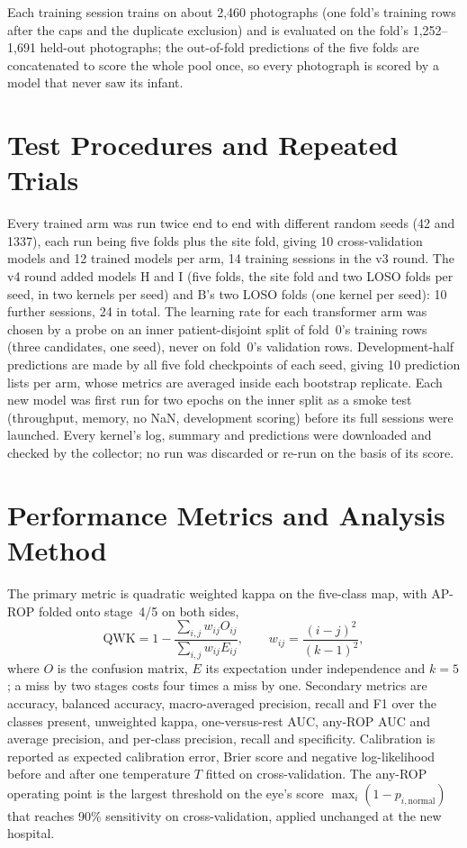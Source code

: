 Each training session trains on about 2{,}460 photographs (one fold's training rows after the caps and the duplicate exclusion) and is evaluated on the fold's 1{,}252--1{,}691 held-out photographs; the out-of-fold predictions of the five folds are concatenated to score the whole pool once, so every photograph is scored by a model that never saw its infant.

\section{Test Procedures and Repeated Trials}
Every trained arm was run twice end to end with different random seeds (42 and 1337), each run being five folds plus the site fold, giving 10 cross-validation models and 12 trained models per arm, 14 training sessions in the v3 round. The v4 round added models H and I (five folds, the site fold and two LOSO folds per seed, in two kernels per seed) and B's two LOSO folds (one kernel per seed): 10 further sessions, 24 in total. The learning rate for each transformer arm was chosen by a probe on an inner patient-disjoint split of fold~0's training rows (three candidates, one seed), never on fold~0's validation rows. Development-half predictions are made by all five fold checkpoints of each seed, giving 10 prediction lists per arm, whose metrics are averaged inside each bootstrap replicate. Each new model was first run for two epochs on the inner split as a smoke test (throughput, memory, no NaN, development scoring) before its full sessions were launched. Every kernel's log, summary and predictions were downloaded and checked by the collector; no run was discarded or re-run on the basis of its score.

\section{Performance Metrics and Analysis Method}
The primary metric is quadratic weighted kappa on the five-class map, with AP-ROP folded onto stage~4/5 on both sides,
\begin{equation}\label{eq:qwk}
\mathrm{QWK}=1-\frac{\sum_{i,j}w_{ij}O_{ij}}{\sum_{i,j}w_{ij}E_{ij}},\qquad w_{ij}=\frac{(i-j)^2}{(k-1)^2},
\end{equation}
where $O$ is the confusion matrix, $E$ its expectation under independence and $k=5$; a miss by two stages costs four times a miss by one. Secondary metrics are accuracy, balanced accuracy, macro-averaged precision, recall and F1 over the classes present, unweighted kappa, one-versus-rest AUC, any-ROP AUC and average precision, and per-class precision, recall and specificity. Calibration is reported as expected calibration error, Brier score and negative log-likelihood before and after one temperature $T$ fitted on cross-validation. The any-ROP operating point is the largest threshold on the eye's score $\max_i(1-p_{i,\text{normal}})$ that reaches 90\% sensitivity on cross-validation, applied unchanged at the new hospital.

